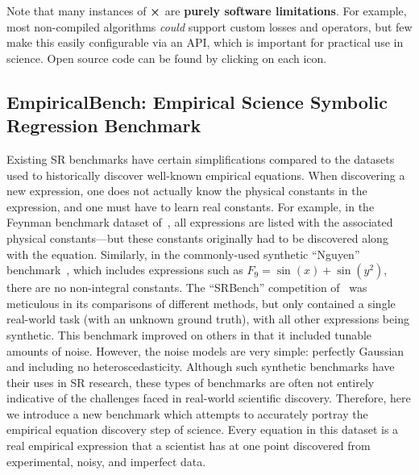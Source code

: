 \documentclass[letterpaper,twocolumn]{scrartcl}
\begin{document}
\onecolumn
\begin{landscape}
\begin{table*} \centering
    \scriptsize
{}
    \caption{Note that many instances of {\color{red}$\cross$} are \textbf{purely software limitations}. For example, most non-compiled algorithms \textit{could} support custom losses and operators, but few make this easily configurable via an API, which is important for practical use in science. Open source code can be found by clicking on each \href{https://github.com/MilesCranmer/PySR}{\faUnlock\xspace} icon.
    }
    \label{tbl:comparison_table}
\end{table*}
\end{landscape}
\twocolumn


\newcommand\fullbench{Empirical Science Symbolic Regression Benchmark\xspace}
\newcommand\bench{EmpiricalBench\xspace}

\subsection{\bench: \fullbench}
\label{sec:new_benchmark}

Existing SR benchmarks have certain simplifications compared to the datasets used to historically discover well-known empirical equations.
When discovering a new expression, one does not actually know the physical constants in the expression, and one must have to learn real constants.
For example, in the Feynman benchmark dataset of~\cite{udrescuAIFeynmanPhysicsinspired2020}, all expressions are listed with the associated physical constants---but these constants originally had to be discovered along with the equation.
Similarly, in the commonly-used synthetic ``Nguyen'' benchmark~\cite{nguyenquanguySemanticallybasedCrossoverGenetic2011}, which includes expressions such as $F_9=\sin(x)+\sin(y^2)$, there are no non-integral constants.
The ``SRBench'' competition of~\cite{defrancaInterpretableSymbolicRegression2023} was meticulous in its comparisons of different methods, but only contained a single real-world task (with an unknown ground truth), with all other expressions being synthetic.
This benchmark improved on others in that it included tunable amounts of noise.
However, the noise models are very simple: perfectly Gaussian and including no heteroscedasticity.
Although such synthetic benchmarks have their uses in SR research, these types of benchmarks are often not entirely indicative of the challenges faced in real-world scientific discovery.
Therefore, here we introduce a new benchmark which attempts to accurately portray the empirical equation discovery step of science.
Every equation in this dataset is a real empirical expression that a scientist has at one point discovered from experimental, noisy, and imperfect data.
\end{document}
